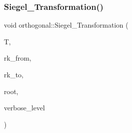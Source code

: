 \mbox{\label{classorthogonal_a27258e68c99323ac8de66fedbe565a3d}} 
\subsubsection{\texorpdfstring{Siegel\+\_\+\+Transformation()}{Siegel\_Transformation()}}
{\footnotesize\ttfamily void orthogonal\+::\+Siegel\+\_\+\+Transformation (\begin{DoxyParamCaption}\item[{\mbox{\hyperlink{galois_8h_a09fddde158a3a20bd2dcadb609de11dc}{I\+NT}} $\ast$}]{T,  }\item[{\mbox{\hyperlink{galois_8h_a09fddde158a3a20bd2dcadb609de11dc}{I\+NT}}}]{rk\+\_\+from,  }\item[{\mbox{\hyperlink{galois_8h_a09fddde158a3a20bd2dcadb609de11dc}{I\+NT}}}]{rk\+\_\+to,  }\item[{\mbox{\hyperlink{galois_8h_a09fddde158a3a20bd2dcadb609de11dc}{I\+NT}}}]{root,  }\item[{\mbox{\hyperlink{galois_8h_a09fddde158a3a20bd2dcadb609de11dc}{I\+NT}}}]{verbose\+\_\+level }\end{DoxyParamCaption})}

\mbox{\label{classorthogonal_aaf1945ebd71495f1b362e5091d4b30ec}} 
